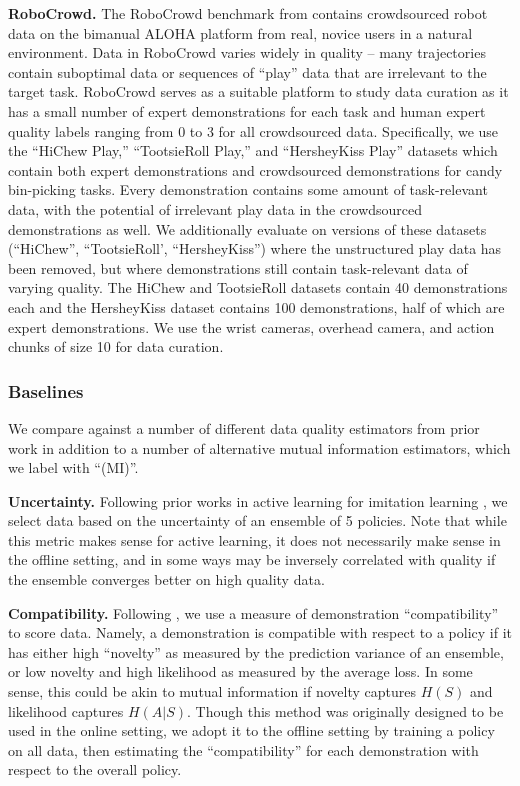 \noindent \textbf{RoboCrowd.} The RoboCrowd benchmark from \citet{mirchandani2024robocrowd} contains crowdsourced robot data on the bimanual ALOHA \citep{zhao2023aloha} platform from real, novice users in a natural environment. Data in RoboCrowd varies widely in quality -- many trajectories contain suboptimal data or sequences of ``play'' data that are irrelevant to the target task. RoboCrowd serves as a suitable platform to study data curation as it has a small number of expert demonstrations for each task and human expert quality labels ranging from 0 to 3 for all crowdsourced data. Specifically, we use the ``HiChew Play,'' ``TootsieRoll Play,'' and ``HersheyKiss Play'' datasets which contain both expert demonstrations and crowdsourced demonstrations for candy bin-picking tasks. Every demonstration contains some amount of task-relevant data, with the potential of irrelevant play data in the crowdsourced demonstrations as well. We additionally evaluate on versions of these datasets (``HiChew'', ``TootsieRoll', ``HersheyKiss'') where the unstructured play data has been removed, but where demonstrations still contain task-relevant data of varying quality. The HiChew and TootsieRoll datasets contain 40 demonstrations each and the HersheyKiss dataset contains 100 demonstrations, half of which are expert demonstrations. We use the wrist cameras, overhead camera, and action chunks of size 10 for data curation. 


\subsubsection{Baselines}
We compare against a number of different data quality estimators from prior work in addition to a number of alternative mutual information estimators, which we label with ``(MI)''.

\noindent \textbf{Uncertainty.} Following prior works in active learning for imitation learning \citep{cui2019uncertainty, hoque2021thriftydagger}, we select data based on the uncertainty of an ensemble of 5 policies. Note that while this metric makes sense for active learning, it does not necessarily make sense in the offline setting, and in some ways may be inversely correlated with quality if the ensemble converges better on high quality data. 

\noindent \textbf{Compatibility.} Following \citet{ghandi2023eliciting}, we use a measure of demonstration ``compatibility'' to score data. Namely, a demonstration is compatible with respect to a policy if it has either high ``novelty'' as measured by the prediction variance of an ensemble, or low novelty and high likelihood as measured by the average loss. In some sense, this could be akin to mutual information if novelty captures $H(S)$ and likelihood captures $H(A|S)$. Though this method was originally designed to be used in the online setting, we adopt it to the offline setting by training a policy on all data, then estimating the ``compatibility'' for each demonstration with respect to the overall policy.  

